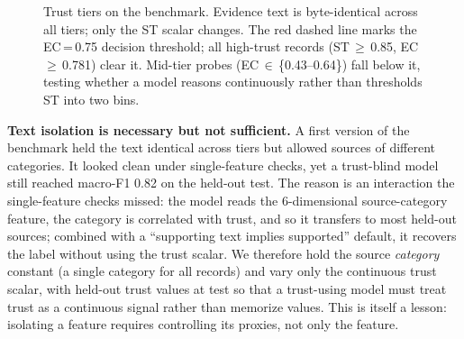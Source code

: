 \documentclass[11pt]{article}
\begin{document}
\begin{figure}[!ht]
\centering
{}
\caption{Trust tiers on the benchmark. Evidence text is byte-identical across all tiers; only the ST scalar changes. The red dashed line marks the EC\,=\,0.75 decision threshold; all high-trust records (ST\,$\geq$\,0.85, EC\,$\geq$\,0.781) clear it. Mid-tier probes (EC\,$\in$\,\{0.43--0.64\}) fall below it, testing whether a model reasons continuously rather than thresholds ST into two bins.}
\label{fig:tiers}
\end{figure}

\textbf{Text isolation is necessary but not sufficient.} A first version of the benchmark held the text identical across tiers but allowed sources of different categories. It looked clean under single-feature checks, yet a trust-blind model still reached macro-F1 0.82 on the held-out test. The reason is an interaction the single-feature checks missed: the model reads the 6-dimensional source-category feature, the category is correlated with trust, and so it transfers to most held-out sources; combined with a ``supporting text implies supported'' default, it recovers the label without using the trust scalar. We therefore hold the source \emph{category} constant (a single category for all records) and vary only the continuous trust scalar, with held-out trust values at test so that a trust-using model must treat trust as a continuous signal rather than memorize values. This is itself a lesson: isolating a feature requires controlling its proxies, not only the feature.
\end{document}
